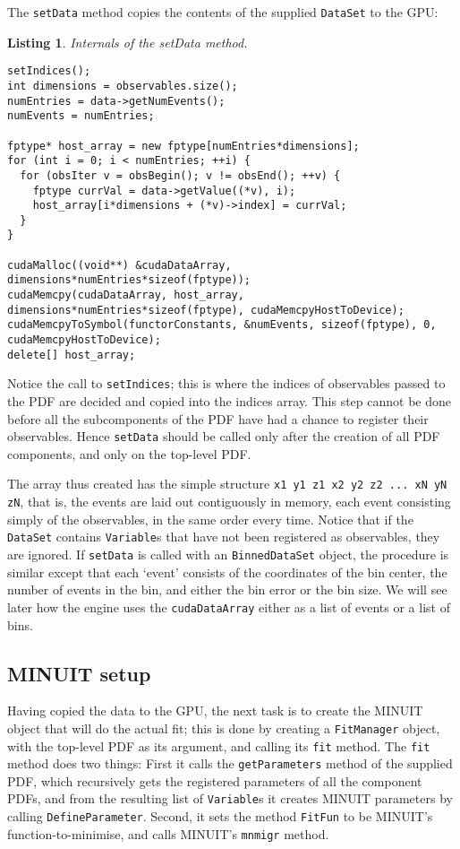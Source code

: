\documentclass[12pt,pdflatex]{article}
\newtheorem{listing}{Listing}
\begin{document}
The \texttt{setData} method copies the contents of the supplied \texttt{DataSet}
to the GPU:
\begin{listing}
\label{listing:setData}
Internals of the setData method.

\begin{verbatim}
setIndices();
int dimensions = observables.size();
numEntries = data->getNumEvents(); 
numEvents = numEntries; 

fptype* host_array = new fptype[numEntries*dimensions];
for (int i = 0; i < numEntries; ++i) {
  for (obsIter v = obsBegin(); v != obsEnd(); ++v) {
    fptype currVal = data->getValue((*v), i);
    host_array[i*dimensions + (*v)->index] = currVal; 
  }
}

cudaMalloc((void**) &cudaDataArray, dimensions*numEntries*sizeof(fptype)); 
cudaMemcpy(cudaDataArray, host_array, dimensions*numEntries*sizeof(fptype), cudaMemcpyHostToDevice);
cudaMemcpyToSymbol(functorConstants, &numEvents, sizeof(fptype), 0, cudaMemcpyHostToDevice); 
delete[] host_array; 
\end{verbatim}
\end{listing} 
Notice the call to \texttt{setIndices}; this is where the indices
of observables passed to the PDF are decided and copied into the indices
array. This step cannot be done before all the subcomponents of the 
PDF have had a chance to register their observables. Hence \texttt{setData}
should be called only after the creation of all PDF components, and only
on the top-level PDF. 

The array thus created has the simple structure \verb|x1 y1 z1 x2 y2 z2 ... xN yN zN|,
that is, the events are laid out contiguously in memory, each event consisting simply
of the observables, in the same order every time. Notice that if the \texttt{DataSet} contains \texttt{Variable}s
that have not been registered as observables, they are ignored. 
If \texttt{setData}
is called with an \texttt{BinnedDataSet} object, the procedure is similar
except that each `event' consists of the coordinates of the bin center, the
number of events in the bin, and either the bin error or the bin size. We will
see later how the engine uses the \texttt{cudaDataArray} either as a list
of events or a list of bins. 

\subsection{MINUIT setup} 

Having copied the data to the GPU, the next task is to create the MINUIT object
that will do the actual fit; this is done by creating a \texttt{FitManager} object,
with the top-level PDF as its argument, and calling its \texttt{fit} method. 
The \texttt{fit} method does two things: First it calls the \texttt{getParameters}
method of the supplied PDF, which recursively gets the registered parameters of
all the component PDFs, and from the resulting list of \texttt{Variable}s it creates
MINUIT parameters by calling \texttt{DefineParameter}. Second, it sets the method
\texttt{FitFun} to be MINUIT's function-to-minimise, and calls MINUIT's \texttt{mnmigr}
method. 
\end{document}

